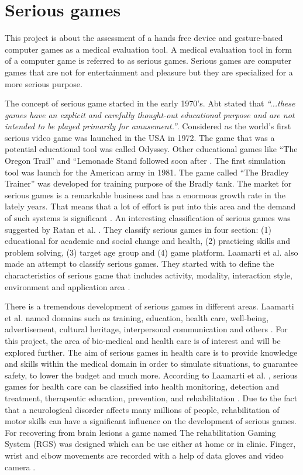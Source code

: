 \section{Serious games}
\label{sec:seriousgames}
This project is about the assessment of a hands free device and gesture-based computer games as a medical evaluation tool. A medical evaluation tool in form of a computer game is referred to as serious games. Serious games are computer games that are not for entertainment and pleasure but they are specialized for a more serious purpose. 

The concept of serious game started in the early 1970’s. Abt \cite{Abt1970} stated that \textit{“...these games have an explicit and carefully thought-out educational purpose and are not intended to be played primarily for amusement.”}.
Considered as the  world’s first serious video game was launched in the USA in 1972. The game that was a potential educational tool was called Odyssey. Other educational games like “The Oregon Trail” and “Lemonade Stand followed soon after \cite{Laamarti2014}. 
The first simulation tool was launch for the American army in 1981.  The game called “The Bradley Trainer” was developed for training purpose of the Bradly tank.
The market for serious games is a remarkable business and has a enormous growth rate in the lately years. That means that a lot of effort is put into this area and the demand of such systems is significant \cite{Laamarti2014}.
An interesting classification of serious games was suggested by Ratan et al. \cite{Ratan2009}. They classify serious games in four section: (1) educational for academic and social change and health, (2) practicing skills and problem solving, (3) target age group and (4) game platform.
Laamarti et al. also made an attempt to classify serious games. They started with to define the characteristics of serious game that includes activity, modality, interaction style, environment and application area \cite{Laamarti2014}. 

There is a tremendous development of serious games in different areas. Laamarti et al. named domains such as training, education, health care, well-being, advertisement, cultural heritage,  interpersonal communication and others \cite{Laamarti2014}. 
For this project, the area of  bio-medical and health care is of interest and will be explored further. The aim of  serious games in health care is to provide knowledge and skills within the medical domain in order to simulate situations, to guarantee safety, to lower the budget and much more. According to Laamarti et al. \cite{Laamarti2014}, serious games for health care can be classified into health monitoring, detection and treatment, therapeutic education, prevention, and rehabilitation \cite{Laamarti2014}. Due to the fact that a neurological disorder affects many millions of people, rehabilitation of motor skills can have a significant influence on the development of serious games. For recovering from brain lesions a game named The rehabilitation Gaming System (RGS) was designed which can be use either at home or in clinic. Finger, wrist and elbow  movements are recorded with a help of data gloves and video camera \cite{Cameirao2009}.

